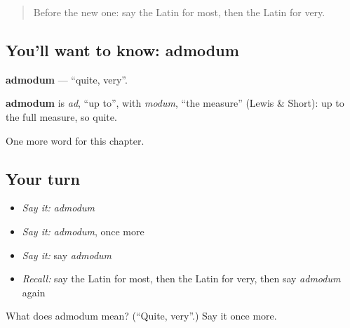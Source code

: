 \label{lesson:LA-C179-admodum}



\begin{quote}
Before the new one: say the Latin for most, then the Latin for very.
\end{quote}

\subsection*{You'll want to know: admodum}
\textbf{admodum} — \textquotedblleft{}quite, very\textquotedblright{}.

\begin{cousinweb}
\textbf{admodum} is \emph{ad}, \textquotedblleft{}up to\textquotedblright{}, with \emph{modum}, \textquotedblleft{}the measure\textquotedblright{} (Lewis \& Short): up to the full measure, so quite.
\end{cousinweb}

\begin{grammarlens}[title={What you've built}]
One more word for this chapter.
\end{grammarlens}

\subsection*{Your turn}
\begin{itemize}
\raggedright
  \item \emph{Say it:} \emph{admodum}
  \item \emph{Say it:} \emph{admodum}, once more
  \item \emph{Say it:} say \emph{admodum}
  \item \emph{Recall:} say the Latin for most, then the Latin for very, then say \emph{admodum} again
\end{itemize}

\begin{tcolorbox}[breakable,colback=teal!4,colframe=teal!35!black,title={Before you move on}]
What does admodum mean? (\textquotedblleft{}Quite, very\textquotedblright{}.) Say it once more.
\end{tcolorbox}
